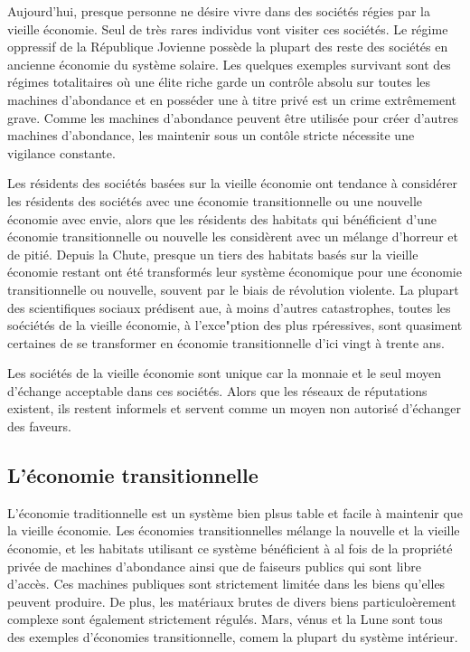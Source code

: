 Aujourd'hui, presque personne ne désire vivre dans des sociétés régies par la vieille économie. Seul de très rares individus vont visiter ces sociétés. Le régime oppressif de la République Jovienne possède la plupart des reste des sociétés en ancienne économie du système solaire. Les quelques exemples survivant sont des régimes totalitaires où une élite riche garde un contrôle absolu sur toutes les machines d'abondance et en posséder une à titre privé est un crime extrêmement grave. Comme les machines d'abondance peuvent être utilisée pour créer d'autres machines d'abondance, les maintenir sous un contôle stricte nécessite une vigilance constante. 

Les résidents des sociétés basées sur la vieille économie ont tendance à considérer les résidents des sociétés avec une économie transitionnelle ou une nouvelle économie avec envie, alors que les résidents des habitats qui bénéficient d'une économie transitionnelle ou nouvelle les considèrent avec un mélange d'horreur et de pitié. Depuis la Chute, presque un tiers des habitats basés sur la vieille économie restant ont été transformés leur système économique pour une économie transitionnelle ou nouvelle, souvent par le biais de révolution violente. La plupart des scientifiques sociaux prédisent aue, à moins d'autres catastrophes, toutes les soéciétés de la vieille économie, à l'exce"ption des plus rpéressives, sont quasiment certaines de se transformer en économie transitionnelle d'ici vingt à trente ans. 

Les sociétés de la vieille économie sont unique car la monnaie et le seul moyen d'échange acceptable dans ces sociétés. Alors que les réseaux de réputations existent, ils restent informels et servent comme un moyen non autorisé d'échanger des faveurs. 

\subsection{L'économie transitionnelle} \label{sec:transitional-economy} 

L'économie traditionnelle est un système bien plsus table et facile à maintenir que la vieille économie. Les économies transitionnelles mélange la nouvelle et la vieille économie, et les habitats utilisant ce système bénéficient à al fois de la propriété privée de machines d'abondance ainsi que de faiseurs publics qui sont libre d'accès. Ces machines publiques sont strictement limitée dans les biens qu'elles peuvent produire. De plus, les matériaux brutes de divers biens particuloèrement complexe sont également strictement régulés. Mars, vénus et la Lune sont tous des exemples d'économies transitionnelle, comem la plupart du système intérieur. 

